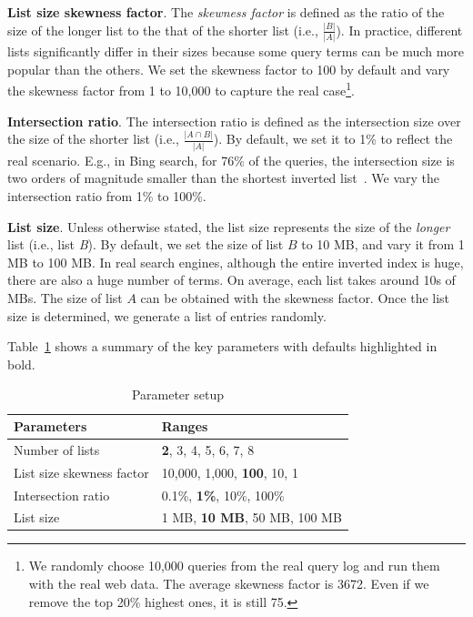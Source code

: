 \textbf{List size skewness factor}. The \emph{skewness factor} is defined as the ratio of the size of the longer list to the that of the shorter list (i.e., $\frac{|B|}{|A|}$). In practice, different lists significantly differ in their sizes because some query terms can be much more popular than the others. We set the skewness factor to 100 by default and vary the skewness factor from 1 to 10,000 to capture the real case\footnote{\small We randomly choose 10,000 queries from the real query log and run them with the real web data. The average skewness factor is 3672. Even if we remove the top 20\% highest ones, it is still 75.}.

\textbf{Intersection ratio}. The intersection ratio is defined as the intersection size over the size of the shorter list (i.e., $\frac{|A\cap B|}{|A|}$). By default, we set it to 1\% to reflect the real scenario. E.g., in Bing search, for 76\% of the queries, the intersection size is two orders of magnitude smaller than the shortest inverted list~\cite{Ding2011}. We vary the intersection ratio from 1\% to 100\%.


\textbf{List size}. Unless otherwise stated, the list size represents the size of the \emph{longer} list (i.e., list \emph{B}).
By default, we set the size of list $B$ to 10 MB, and vary it from 1 MB to 100 MB. In real search engines, although the entire inverted index is huge, there are also a huge number of terms. On average, each list takes around 10s of MBs. The size of list $A$ can be obtained with the skewness factor. Once the list size is determined, we generate a list of entries randomly.

Table~\ref{tab:synData} shows a summary of the key parameters with defaults highlighted in bold.

\begin{table}[tbp]
\centering\small
\begin{tabular}{l|l}\hline\hline
\textbf{Parameters}  &   \textbf{Ranges}   \\\hline
Number of lists & \textbf{2}, 3, 4, 5, 6, 7, 8\\\hline
List size skewness factor  & 10,000, 1,000, \textbf{100}, 10, 1\\\hline
Intersection ratio  &   0.1\%, \textbf{1\%}, 10\%, 100\%\\\hline
List size & 1 MB, \textbf{10 MB}, 50 MB, 100 MB\\\hline\hline
\end{tabular}
\caption{Parameter setup}\label{tab:synData}
\end{table}



